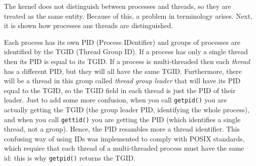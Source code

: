 \documentclass[10pt, oneside]{book}
\begin{document}
The kernel does not distinguish between processes and threads, so they are treated as the same entity. Because of this, a problem in terminology arises. Next, it is shown how processes ans threads are distinguished.

Each process has its own PID (Process IDentifier) and groups of processes are identified by the TGID (Thread Group ID). If a process has only a single thread then its PID is equal to its TGID. If a process is multi-threaded then each \textit{thread} has a different PID, but they will all have the same TGID. Furthermore, there will be a thread in this group called \textit{thread group leader} that will have its PID equal to the TGID, so the TGID field in each thread is just the PID of their leader. Just to add some more confusion, when you call \verb|getpid()| you are actually getting the TGID (the group leader PID, identifying the whole process), and when you call \verb|gettid()| you are getting the PID (which identifies a single thread, not a group). Hence, the PID resambles more a thread identifier.
This confusing way of using IDs was implemented to comply with POSIX standards, which require that each thread of a multi-threaded process must have the same id: this is why \verb|getpid()| returns the TGID.
\end{document}
